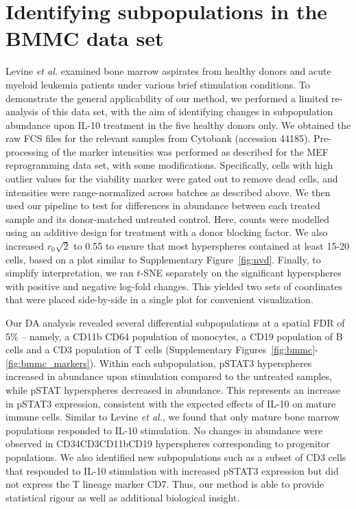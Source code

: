 \documentclass{article}
\begin{document}
\section{Identifying subpopulations in the BMMC data set}
\label{sec:bmmc}
Levine \textit{et al.} \cite{levine2015datadriven} examined bone marrow aspirates from healthy donors and acute myeloid leukemia patients under various brief stimulation conditions.
To demonstrate the general applicability of our method, we performed a limited re-analysis of this data set, with the aim of identifying changes in subpopulation abundance upon IL-10 treatment in the five healthy donors only.
We obtained the raw FCS files for the relevant samples from Cytobank (accession 44185).
Pre-processing of the marker intensities was performed as described for the MEF reprogramming data set, with some modifications.
Specifically, cells with high outlier values for the viability marker were gated out to remove dead cells, and intensities were range-normalized across batches as described above.
We then used our pipeline to test for differences in abundance between each treated sample and its donor-matched untreated control.
Here, counts were modelled using an additive design for treatment with a donor blocking factor.
We also increased $r_0\sqrt{2}$ to 0.55 to ensure that most hyperspheres contained at least 15-20 cells, based on a plot similar to Supplementary Figure~\ref{fig:nvd}.
Finally, to simplify interpretation, we ran $t$-SNE separately on the significant hyperspheres with positive and negative log-fold changes.
This yielded two sets of coordinates that were placed side-by-side in a single plot for convenient visualization.

Our DA analysis revealed several differential subpopulations at a spatial FDR of 5\% -- namely, a CD11b\hi{} CD64\hi{} population of monocytes, a CD19\hi{} population of B cells and a CD3\hi{} population of T cells (Supplementary Figures~\ref{fig:bmmc}-\ref{fig:bmmc_markers}).
Within each subpopulation, pSTAT3\hi{} hyperspheres increased in abundance upon stimulation compared to the untreated samples, while pSTAT\lo{} hyperspheres decreased in abundance.
This represents an increase in pSTAT3 expression, consistent with the expected effects of IL-10 on mature immune cells.
Similar to Levine \textit{et al.}, we found that only mature bone marrow populations responded to IL-10 stimulation.
No changes in abundance were observed in CD34\hi{}CD3\lo{}CD11b\lo{}CD19\lo{} hyperspheres corresponding to progenitor populations.
We also identified new subpopulations such as a subset of CD3\hi{} cells that responded to IL-10 stimulation with increased pSTAT3 expression but did not express the T lineage marker CD7.
Thus, our method is able to provide statistical rigour as well as additional biological insight.
\end{document}
